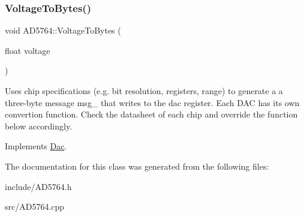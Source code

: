 \subsubsection{\texorpdfstring{Voltage\+To\+Bytes()}{VoltageToBytes()}}
{\footnotesize\ttfamily void A\+D5764\+::\+Voltage\+To\+Bytes (\begin{DoxyParamCaption}\item[{float}]{voltage }\end{DoxyParamCaption})\hspace{0.3cm}{\ttfamily [virtual]}}

Uses chip specifications (e.\+g. bit resolution, registers, range) to generate a a three-\/byte message msg\+\_\+ that writes to the dac register. Each D\+AC has its own convertion function. Check the datasheet of each chip and override the function below accordingly. 

Implements \mbox{\hyperlink{classDac_ac21022b2b921437418004af9ae7de8ae}{Dac}}.



The documentation for this class was generated from the following files\+:\begin{DoxyCompactItemize}
\item 
include/A\+D5764.\+h\item 
src/A\+D5764.\+cpp\end{DoxyCompactItemize}
